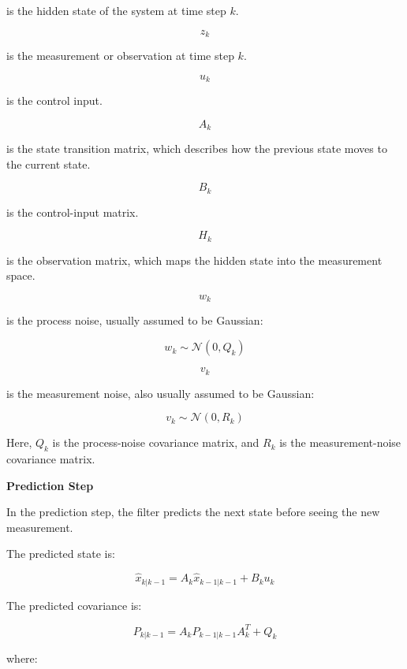 \documentclass{book}
\providecommand{\ProjectDeepHeading}[2]{%
    \par\medskip\noindent\textbf{#2}\par\smallskip
}
\begin{document}
        is the hidden state of the system at time step \(k\).
        
        \[
            z_k
        \]
        
        is the measurement or observation at time step \(k\).
        
        \[
            u_k
        \]
        
        is the control input.
        
        \[
            A_k
        \]
        
        is the state transition matrix, which describes how the previous state moves to the current state.
        
        \[
            B_k
        \]
        
        is the control-input matrix.
        
        \[
            H_k
        \]
        
        is the observation matrix, which maps the hidden state into the measurement space.
        
        \[
            w_k
        \]
        
        is the process noise, usually assumed to be Gaussian:
        
        \[
            w_k \sim \mathcal{N}(0, Q_k)
        \]
        
        \[
            v_k
        \]
        
        is the measurement noise, also usually assumed to be Gaussian:
        
        \[
            v_k \sim \mathcal{N}(0, R_k)
        \]
        
        Here, \(Q_k\) is the process-noise covariance matrix, and \(R_k\) is the measurement-noise covariance matrix.
    
    
    \ProjectDeepHeading{11}{Prediction Step}
        
        In the prediction step, the filter predicts the next state before seeing the new measurement.
        
        The predicted state is:
        
        \[
            \hat{x}_{k|k-1} = A_k \hat{x}_{k-1|k-1} + B_k u_k
        \]
        
        The predicted covariance is:
        
        \[
            P_{k|k-1} = A_k P_{k-1|k-1} A_k^T + Q_k
        \]
        
        where:
        
\end{document}
